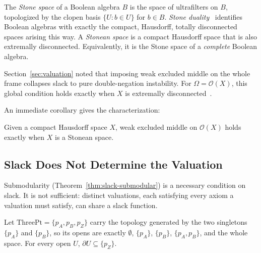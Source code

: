 \begin{definition}
The \emph{Stone space} of a Boolean algebra $B$ is the space of
ultrafilters on $B$, topologized by the clopen basis $\{U : b \in U\}$
for $b \in B$. \emph{Stone duality}~\cite{johnstone1982} identifies
Boolean algebras with exactly the compact, Hausdorff, totally
disconnected spaces arising this way.  A \emph{Stonean space} is a compact Hausdorff space that
is also extremally disconnected. Equivalently, it is the Stone space
of a \emph{complete} Boolean algebra.
\end{definition}

\begin{remark}
Section~\ref{sec:valuation} noted that imposing weak excluded middle
on the whole frame collapses slack to pure double-negation
instability.  For $\Omega = \mathcal{O}(X)$, this global condition
holds exactly when $X$ is extremally disconnected~\cite{johnstone1980}.
\end{remark}

An immediate corollary gives the characterization:

\begin{corollary}
Given a compact Hausdorff space $X$, weak excluded middle on
$\mathcal{O}(X)$ holds exactly when $X$ is a Stonean space.
\end{corollary}

\subsection{Slack Does Not Determine the Valuation}
\label{sec:no-recovery}

Submodularity (Theorem~\ref{thm:slack-submodular}) is a necessary
condition on slack.  It is not sufficient: distinct valuations, each
satisfying every axiom a valuation must satisfy, can share a slack
function.

\begin{example}
\label{thm:threept-frontier}
Let $\mathrm{ThreePt} = \{p_A, p_B, p_Z\}$ carry the topology
generated by the two singletons $\{p_A\}$ and $\{p_B\}$, so its opens
are exactly $\emptyset$, $\{p_A\}$, $\{p_B\}$, $\{p_A, p_B\}$, and the
whole space.  For every open $U$, $\partial U \subseteq \{p_Z\}$.
\end{example}

